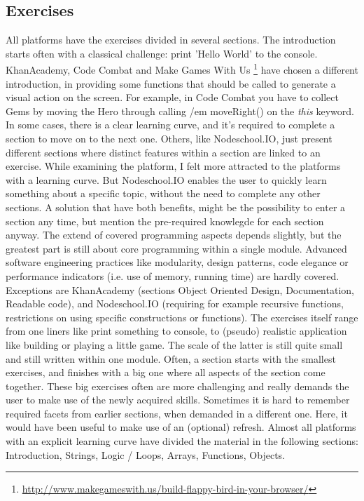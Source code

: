 \documentclass{article}
\begin{document}
\subsection{Exercises}
All platforms have the exercises divided in several sections. The introduction
starts often with a classical challenge: print 'Hello World' to the console. 
KhanAcademy, Code Combat and Make Games With Us
\footnote{\url{http://www.makegameswith.us/build-flappy-bird-in-your-browser/}}
have chosen a different introduction, in providing some functions that should be
called to generate a visual action on the screen. For example, in Code Combat 
you have to collect Gems by moving the Hero through calling {/em moveRight()} on 
the {\em this} keyword. \newline
In some cases, there is a clear learning curve, and it's required to complete a
section to move on to the next one. Others, like Nodeschool.IO, just present 
different sections where distinct features within a section are linked to an
exercise. While examining the platform, I felt more attracted to the platforms
with a learning curve. But Nodeschool.IO enables the user to quickly learn 
something about a specific topic, without the need to complete any other
sections. A solution that have both benefits, might be the possibility to 
enter a section any time, but mention the pre-required knowlegde for each
section anyway. \newline
The extend of covered programming aspects depends slightly, but the greatest 
part is still about core programming within a single module. Advanced software
engineering practices like modularity, design patterns, code elegance or 
performance indicators (i.e. use of memory, running time) are hardly covered. 
Exceptions are KhanAcademy (sections Object Oriented Design, Documentation, 
Readable code), and Nodeschool.IO (requiring for example recursive functions, 
restrictions on using specific constructions or functions). \newline
The exercises itself range from one liners like print something to console, to
(pseudo) realistic application like building or playing a little game. 
The scale of the latter is still quite small and still written within one module.
Often, a section starts with the smallest exercises, and finishes with a big 
one where all aspects of the section come together. These big exercises often 
are more challenging and really demands the user to make use of the newly 
acquired skills. Sometimes it is hard to remember required facets from earlier
sections, when demanded in a different one. Here, it would have been useful to 
make use of an (optional) refresh. Almost all platforms with an explicit
learning curve have divided the 
material in the following sections: Introduction, Strings, Logic / Loops, 
Arrays, Functions, Objects. 
\end{document}
